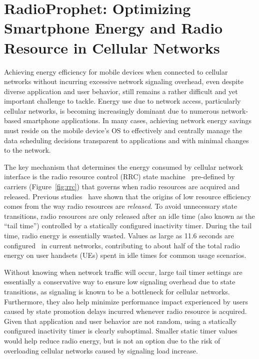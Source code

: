 \chapter{RadioProphet: Optimizing Smartphone Energy and Radio Resource in Cellular Networks}
\label{chap:optimize}

Achieving energy efficiency for mobile devices when connected to cellular networks without incurring excessive network signaling overhead, even despite diverse application and user behavior, still remains a rather difficult and yet important challenge to tackle. Energy use due to network access, particularly cellular networks, is becoming increasingly dominant due to numerous network-based smartphone applications. In many cases, achieving network energy savings must reside on the mobile device's OS to effectively and centrally manage the data scheduling decisions transparent to applications and with minimal changes to the network.

The key mechanism that determines the energy consumed by cellular network interface is the radio resource control (RRC) state machine~\cite{imc.3g} pre-defined by carriers (Figure~\ref{fig:rrc}) that governs when radio resources are acquired and released. Previous studies~\cite{imc.tailender, imc.3g, qian10_icnp, huang_mobisys12} have shown that the origins of low resource efficiency comes from the way radio resources are \emph{released}. To avoid unnecessary state transitions, radio resources are only released after an idle time (also known as the ``tail time'') controlled by a statically configured inactivity timer. During the tail time, radio energy is essentially wasted. Values as large as 11.6 seconds are configured~\cite{huang12_mobisys} in current networks, contributing to about half of the total radio energy on user handsets (UEs) spent in idle times for common usage scenarios.

Without knowing when network traffic will occur, large tail timer settings are essentially a conservative way to ensure low signaling overhead due to state transitions, as signaling is known to be a bottleneck for cellular networks.  Furthermore, they also help minimize performance impact experienced by users caused by state promotion delays incurred whenever radio resource is acquired.
Given that application and user behavior are not random, using a statically configured inactivity timer is clearly suboptimal. Smaller static timer values would help reduce radio energy, but is not an option due to the risk of overloading cellular networks caused by signaling load increase.

